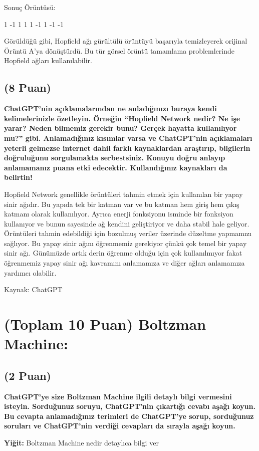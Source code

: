 \documentclass[11pt]{article}
\begin{document}
Sonuç Örüntüsü:
\begin{python}
1 -1  1
1  1 -1
1 -1 -1
\end{python}

Görüldüğü gibi, Hopfield ağı gürültülü örüntüyü başarıyla temizleyerek orijinal Örüntü A'ya dönüştürdü. Bu tür görsel örüntü tamamlama problemlerinde Hopfield ağları kullanılabilir.

\subsection{(8 Puan)} \textbf{ChatGPT’nin açıklamalarından ne anladığınızı buraya kendi kelimelerinizle özetleyin. Örneğin ``Hopfield Network nedir? Ne işe yarar? Neden bilmemiz gerekir bunu? Gerçek hayatta kullanılıyor mu?'' gibi. Anlamadığınız kısımlar varsa ve ChatGPT’nin açıklamaları yeterli gelmezse internet dahil farklı kaynaklardan araştırıp, bilgilerin doğruluğunu sorgulamakta serbestsiniz. Konuyu doğru anlayıp anlamamanız puana etki edecektir. Kullandığınız kaynakları da belirtin!}

Hopfield Network genellikle örüntüleri tahmin etmek için kullanılan bir yapay sinir ağıdır. Bu yapıda tek bir katman var ve bu katman hem giriş hem çıkış katmanı olarak kullanılıyor. Ayrıca enerji fonksiyonu isminde bir fonksiyon kullanıyor ve bunun sayesinde ağ kendini geliştiriyor ve daha stabil hale geliyor. Örüntüleri tahmin edebildiği için bozulmuş veriler üzerinde düzeltme yapmamızı sağlıyor.
Bu yapay sinir ağını öğrenmemiz gerekiyor çünkü çok temel bir yapay sinir ağı. Günümüzde artık derin öğrenme olduğu için çok kullanılmıyor fakat öğrenmemiz yapay sinir ağı kavramını anlamamıza ve diğer ağları anlamamıza yardımcı olabilir.

Kaynak: ChatGPT

\section{(Toplam 10 Puan) Boltzman Machine:}

\subsection{(2 Puan)} \textbf{ChatGPT’ye size Boltzman Machine ilgili detaylı bilgi vermesini isteyin. Sorduğunuz soruyu, ChatGPT'nin çıkartığı cevabı aşağı koyun. Bu cevapta anlamadığınız terimleri de ChatGPT’ye sorup, sorduğunuz soruları ve ChatGPT’nin verdiği cevapları da sırayla aşağı koyun.}

\textbf{Yiğit:} Boltzman Machine nedir detaylıca bilgi ver
\end{document}
